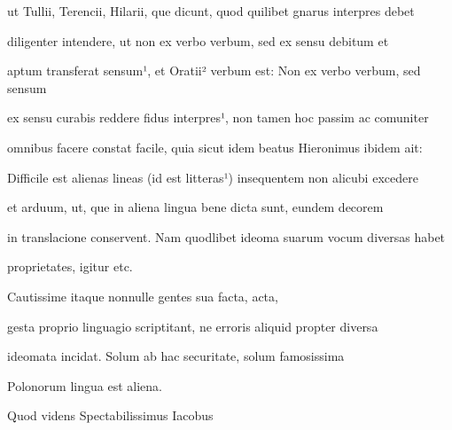 ut Tullii, Terencii, Hilarii, que dicunt, quod quilibet gnarus interpres debet

\fulllines{}

diligenter intendere, ut non ex verbo verbum, sed ex sensu debitum et



aptum transferat sensum¹, et Oratii² verbum est: Non ex verbo verbum, sed sensum
%

ex sensu curabis reddere fidus interpres¹, non tamen hoc passim ac comuniter

omnibus facere constat facile, quia sicut idem beatus Hieronimus ibidem ait:

Difficile est alienas lineas (id est litteras¹) insequentem non alicubi excedere

et arduum, ut, que in aliena lingua bene dicta sunt, eundem decorem

in translacione conservent. Nam quodlibet ideoma suarum vocum diversas habet

\splitlines{}

proprietates, igitur etc.

\indentK Cautissime itaque nonnulle gentes sua facta, acta,

\fulllines{}

gesta proprio linguagio scriptitant, ne erroris aliquid propter diversa

ideomata incidat. Solum ab hac securitate, solum famosissima

\splitlines{}

Polonorum lingua est aliena.

\indentK Quod videns Spectabilissimus Iacobus

\fulllines{}


